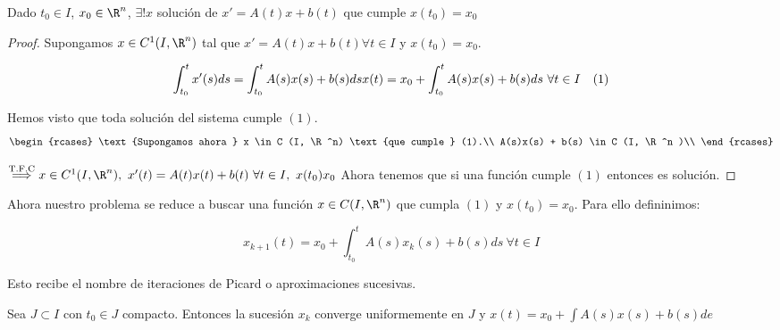 \begin{nth}

  Dado $t_0 \in I$, $x_0 \in \R ^n $, $\exists ! x $ solución de $x' = A(t)x+b(t)$ que cumple $x(t_0) = x_0 $

\end{nth}

\begin{proof}

  Supongamos $x \in C^1 (I, \R ^n) $ tal que $x' = A(t) x + b(t) \forall t \in I$ y $x(t_0) = x_0$.

  \[
  \int _{t_0} ^t x'(s) ds = \int _{t_0} ^t A(s)x(s) + b(s) ds\\
  x(t) = x_0 + \int _{t_0} ^t A(s)x(s) + b(s) ds \ \forall t \in I \ \ \ (1)
  \]

  Hemos visto que toda solución del sistema cumple $(1)$.
\[
  \begin{rcases}
    \text{Supongamos ahora } x \in C (I, \R ^n) \text{que cumple } (1).\\
    A(s)x(s) + b(s) \in C (I, \R ^n )\\
  \end{rcases}
\]
  	
  $\overset{\text{T.F.C}}{\implies} x \in C ^1 (I, \R^n), \ x'(t) = A(t)x(t) + b(t) \ \forall t \in I, \ x(t_0 ) x_0 $
  Ahora tenemos que si una función cumple $(1)$ entonces es solución.


\end{proof}

Ahora nuestro problema se reduce a buscar una función $x \in C (I , \R ^n)$ que cumpla $(1)$ y $x(t_0) = x_0 $.
Para ello defininimos:

\[
x_{k+1} (t) = x_0 + \int _{t_0} ^t A(s)x_k (s) + b(s) ds \ \forall t \in I
\]

Esto recibe el nombre de iteraciones de Picard o aproximaciones sucesivas.

Sea $J \subset I$ con $t_0 \in J$ compacto. Entonces la sucesión ${x_k}$ converge uniformemente en $J$ y $x(t) = x_0 + \int A(s)x(s) + b(s) de $

